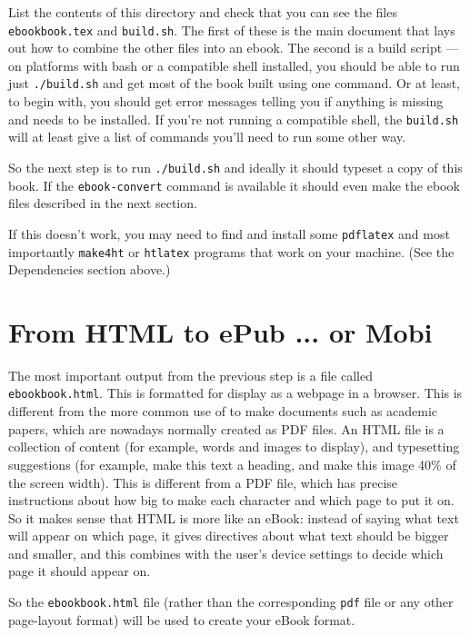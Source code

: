 List the contents of this directory and check that you can see the
files \texttt{ebookbook.tex} and \texttt{build.sh}. The first of these
is the main \tex document that lays out how to combine the other files
into an ebook.  The second is a build script --- on platforms with
bash or a compatible shell installed, you should be able to run just
\texttt{./build.sh} and get most of the book built using one
command. Or at least, to begin with, you should get error messages
telling you if anything is missing and needs to be installed. If you're not
running a compatible shell, the \texttt{build.sh} will at least give a list
of commands you'll need to run some other way.

So the next step is to run \texttt{./build.sh} and ideally it should
typeset a copy of this book. If the \texttt{ebook-convert} command is
available it should even make the ebook files described in the next
section.

If this doesn't work, you may need to find and install some
\texttt{pdflatex} and most importantly \texttt{make4ht} or
\texttt{htlatex} programs that work on your machine. (See the
Dependencies section above.)

\section{From HTML to ePub ... or Mobi}
\label{sec:html2epub}

The most important output from the previous step is a file called
\texttt{ebookbook.html}.  This is formatted for display as a webpage
in a browser. This is different from the more common use of \tex to
make documents such as academic papers, which are nowadays normally
created as PDF files. An HTML file is a collection of content (for
example, words and images to display), and typesetting suggestions
(for example, make this text a heading, and make this image 40\% of
the screen width). This is different from a PDF file, which has
precise instructions about how big to make each character and which
page to put it on. So it makes sense that HTML is more like an eBook:
instead of saying what text will appear on which page, it gives
directives about what text should be bigger and smaller, and this
combines with the user's device settings to decide which page it
should appear on.

So the \texttt{ebookbook.html} file (rather than the corresponding
\texttt{pdf} file or any other page-layout format) will be used to
create your eBook format. 

